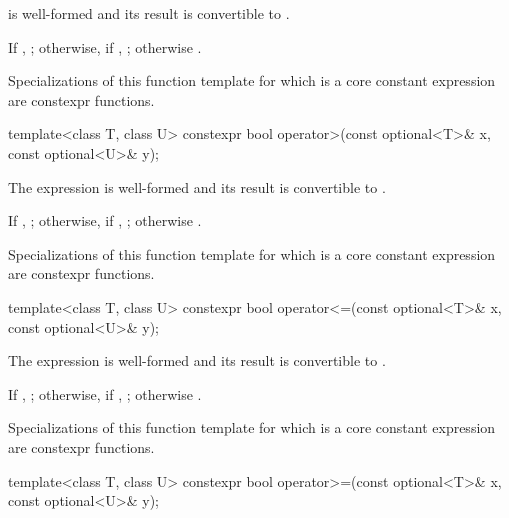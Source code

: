 \begin{itemdescr}
\pnum
\constraints
{} is well-formed
and its result is convertible to .

\pnum
\returns
If , ;
otherwise, if , ;
otherwise .

\pnum
\remarks
Specializations of this function template
for which  is a core constant expression
are constexpr functions.
\end{itemdescr}

%
\begin{itemdecl}
template<class T, class U> constexpr bool operator>(const optional<T>& x, const optional<U>& y);
\end{itemdecl}

\begin{itemdescr}
\pnum
\constraints
The expression  is well-formed and
its result is convertible to .

\pnum
\returns
If , ;
otherwise, if , ;
otherwise .

\pnum
\remarks
Specializations of this function template
for which  is a core constant expression
are constexpr functions.
\end{itemdescr}

%
\begin{itemdecl}
template<class T, class U> constexpr bool operator<=(const optional<T>& x, const optional<U>& y);
\end{itemdecl}

\begin{itemdescr}
\pnum
\constraints
The expression  is well-formed and
its result is convertible to .

\pnum
\returns
If , ;
otherwise, if , ;
otherwise .

\pnum
\remarks
Specializations of this function template
for which  is a core constant expression
are constexpr functions.
\end{itemdescr}

%
\begin{itemdecl}
template<class T, class U> constexpr bool operator>=(const optional<T>& x, const optional<U>& y);
\end{itemdecl}


